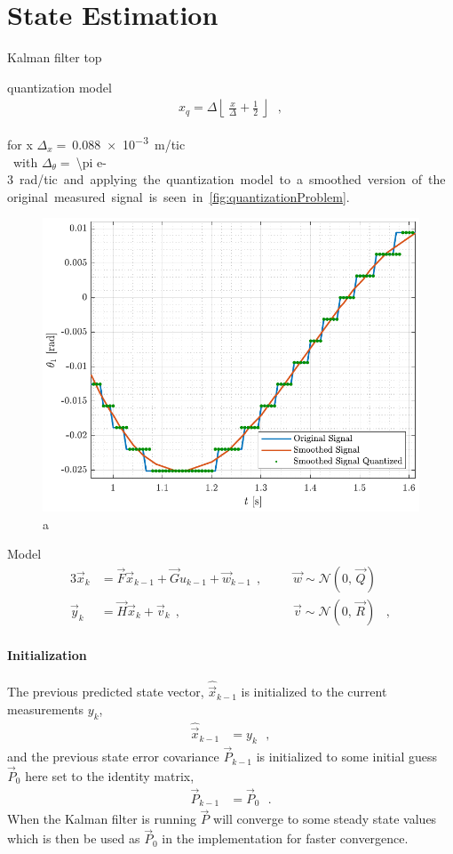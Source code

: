 %
\chapter{State Estimation}

Kalman filter top

quantization model
\begin{align}
x_q = \Delta \left\lfloor\ \frac{x}{\Delta} + \frac{1}{2}\ \right\rfloor \ \ \ ,   \label{eq:quantizationModel}
\end{align}

for x $\Delta_x =\ $\SI{0.088e-3} m/tic\\
with $\Delta_\theta =\ $\SI{\pi e-3} rad/tic and applying the quantization model to a smoothed version of the original measured signal is seen in \autoref{fig:quantizationProblem}.

\begin{figure}[H]
  \includegraphics[width=.7\textwidth]{figures/quantizationProblem}
  \caption{a}
  \label{fig:quantizationProblem}
\end{figure}


Model
\begin{alignat}{3}
\vec{x}_{k} &= \vec{F} \vec{x}_{k-1} + \vec{G} u_{k-1} + \vec{w}_{k-1}  \ \ , &&\ \ \ \ \vec{w} \sim \mathcal{N}(0,\,\vec{Q})\,   \\
\vec{y}_k &= \vec{H} \vec{x}_k + \vec{v}_k                              \ \ , &&\ \ \ \ \vec{v} \sim \mathcal{N}(0,\,\vec{R})\,  \ \ \ , 
  \label{eq:discreteModelForKF}
\end{alignat}


\subsubsection{Initialization}
The previous predicted state vector, $\hat{\vec{x}}_{k-1}$ is initialized to the current measurements $y_k$,
%
\begin{align}
\hat{\vec{x}}_{k-1} &= y_k \ \ \ ,   \label{eq:xInit}
\end{align}
%
and the previous state error covariance $\vec{P}_{k-1}$ is initialized to some initial guess $\vec{P}_0$ here set to the identity matrix,
\begin{align}
\vec{P}_{k-1} &= \vec{P}_0  \ \ \ . \label{eq:initP}
\end{align}
%
When the Kalman filter is running $\vec{P}$ will converge to some steady state values which is then be used as $\vec{P}_0$ in the implementation for faster convergence.

